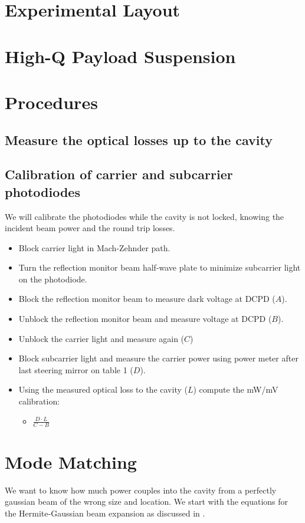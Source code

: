 
\section{Experimental Layout}

\section{High-Q Payload Suspension}

\section{Procedures}

\subsection{Measure the optical losses up to the cavity}

\subsection{Calibration of carrier and subcarrier photodiodes}
We will calibrate the photodiodes while the cavity is not locked, knowing the incident beam power and the round trip losses.

\begin{itemize}
    \item Block carrier light in Mach-Zehnder path.
    \item Turn the reflection monitor beam half-wave plate to minimize subcarrier light on the photodiode.
    \item Block the reflection monitor beam to measure dark voltage at DCPD ($A$).
    \item Unblock the reflection monitor beam and measure voltage at DCPD ($B$).
    \item Unblock the carrier light and measure again ($C$)
    \item Block subcarrier light and measure the carrier power using power meter after last steering mirror on table 1 ($D$).
    \item Using the measured optical loss to the cavity ($L$) compute the mW/mV calibration:
    \begin{itemize}
        \item $\frac{D\cdot L}{C - B}$
    \end{itemize}
\end{itemize}

\section{Mode Matching}
We want to know how much power couples into the cavity from a
perfectly gaussian beam of the wrong size and location. We start with
the equations for the Hermite-Gaussian beam expansion as discussed in
\cite{Siegman86}.

